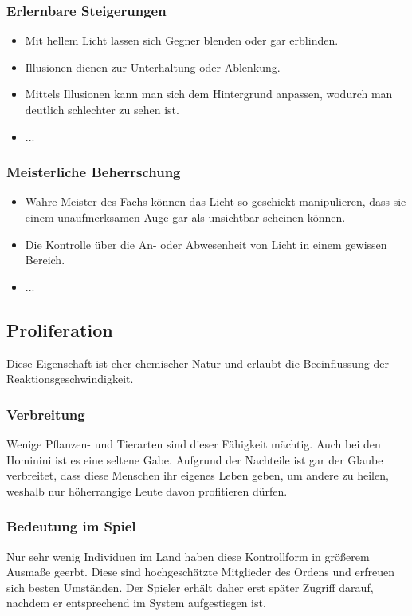 \subsubsection{Erlernbare Steigerungen}
\begin{itemize}
	\item Mit hellem Licht lassen sich Gegner blenden oder gar erblinden.
	\item Illusionen dienen zur Unterhaltung oder Ablenkung.
	\item Mittels Illusionen kann man sich dem Hintergrund anpassen, wodurch man deutlich schlechter zu sehen ist.
	\item ...
\end{itemize}

\subsubsection{Meisterliche Beherrschung} 
\begin{itemize}
	\item Wahre Meister des Fachs können das Licht so geschickt manipulieren, dass sie einem unaufmerksamen Auge gar als unsichtbar scheinen können.
	\item Die Kontrolle über die An- oder Abwesenheit von Licht in einem gewissen Bereich.
	\item ...
\end{itemize}



\subsection{Proliferation}\label{sec:proliferationsmagie}
Diese Eigenschaft ist eher chemischer Natur und erlaubt die Beeinflussung der Reaktionsgeschwindigkeit.

\subsubsection{Verbreitung}
Wenige Pflanzen- und Tierarten sind dieser Fähigkeit mächtig. Auch bei den Hominini ist es eine seltene Gabe. Aufgrund der Nachteile ist gar der Glaube verbreitet, dass diese Menschen ihr eigenes Leben geben, um andere zu heilen, weshalb nur höherrangige Leute davon profitieren dürfen.

\subsubsection{Bedeutung im Spiel}
Nur sehr wenig Individuen im Land haben diese Kontrollform in größerem Ausmaße geerbt. Diese sind hochgeschätzte Mitglieder des Ordens und erfreuen sich besten Umständen. Der Spieler erhält daher erst später Zugriff darauf, nachdem er entsprechend im System aufgestiegen ist.

